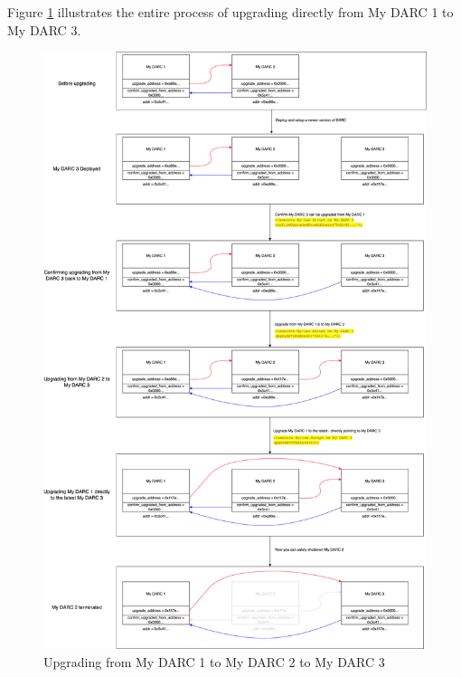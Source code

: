\documentclass[main.tex]{subfiles}
\begin{document}
Figure \ref{fig:upgrade-multi} illustrates the entire process of upgrading directly from My DARC 1 to My DARC 3.






\begin{figure}
\centering
\includegraphics[width=1\linewidth]{upgradablity-multi.drawio.png}
\caption{\label{fig:upgrade-multi}Upgrading from My DARC 1 to My DARC 2 to My DARC 3}
\end{figure}
\end{document}
